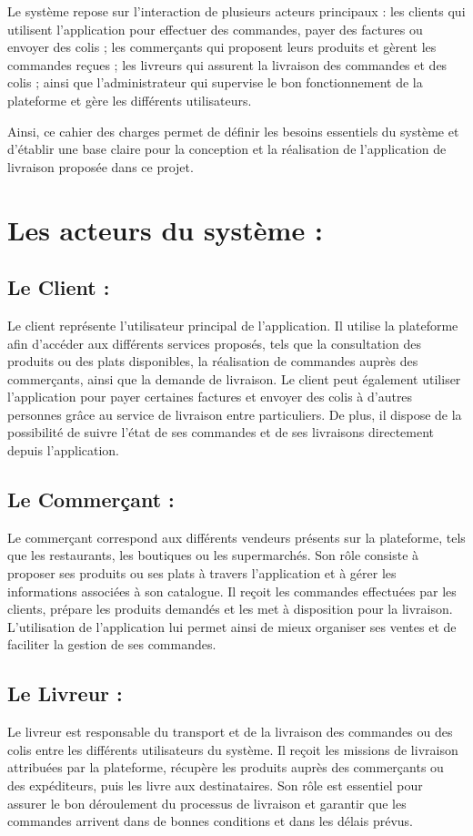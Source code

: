 \documentclass[12pt,fleqn,a4paper]{report}
\begin{document}
\begin{justify}
Le système repose sur l'interaction de plusieurs acteurs principaux : les clients qui utilisent l'application pour effectuer des commandes, payer des factures ou envoyer des colis ; les commerçants qui proposent leurs produits et gèrent les commandes reçues ; les livreurs qui assurent la livraison des commandes et des colis ; ainsi que l'administrateur qui supervise le bon fonctionnement de la plateforme et gère les différents utilisateurs.

Ainsi, ce cahier des charges permet de définir les besoins essentiels du système et d'établir une base claire pour la conception et la réalisation de l'application de livraison proposée dans ce projet.

\section{Les acteurs du système :}
\subsection{Le Client :}
Le client représente l'utilisateur principal de l'application. Il utilise la plateforme afin d'accéder aux différents services proposés, tels que la consultation des produits ou des plats disponibles, la réalisation de commandes auprès des commerçants, ainsi que la demande de livraison. Le client peut également utiliser l'application pour payer certaines factures et envoyer des colis à d'autres personnes grâce au service de livraison entre particuliers. De plus, il dispose de la possibilité de suivre l'état de ses commandes et de ses livraisons directement depuis l'application.

\subsection{Le Commerçant :}
Le commerçant correspond aux différents vendeurs présents sur la plateforme, tels que les restaurants, les boutiques ou les supermarchés. Son rôle consiste à proposer ses produits ou ses plats à travers l'application et à gérer les informations associées à son catalogue. Il reçoit les commandes effectuées par les clients, prépare les produits demandés et les met à disposition pour la livraison. L'utilisation de l'application lui permet ainsi de mieux organiser ses ventes et de faciliter la gestion de ses commandes.

\subsection{Le Livreur :}
Le livreur est responsable du transport et de la livraison des commandes ou des colis entre les différents utilisateurs du système. Il reçoit les missions de livraison attribuées par la plateforme, récupère les produits auprès des commerçants ou des expéditeurs, puis les livre aux destinataires. Son rôle est essentiel pour assurer le bon déroulement du processus de livraison et garantir que les commandes arrivent dans de bonnes conditions et dans les délais prévus.


\end{justify}
\end{document}
